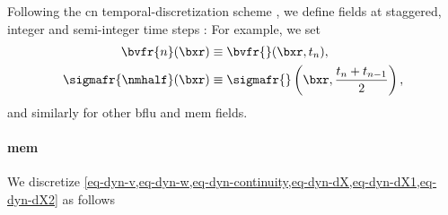 Following the \ac{cn} temporal-discretization scheme \cite{crankPracticalMethodNumerical1947}, we define fields at staggered,  integer and semi-integer time steps  \cite{loggAutomatedSolutionDifferential2012}: For example, we set
\begin{align}
        \label{eq_time_step_1}
        \bvfr{n}(\bxr)          & \equiv \bvfr{}(\bxr, t_n)  ,                               \\
        \label{eq_time_step_2}
        \sigmafr{\nmhalf}(\bxr) & \equiv \sigmafr{}\left(\bxr, \frac{t_n+t_{n-1}}{2}\right),
\end{align}
and similarly for other \ac{bflu} and \ac{mem} fields.

\paragraph{\Acl{mem}}\label{sec_temp_discretization_mem_mem}


We discretize \cref{eq-dyn-v,eq-dyn-w,eq-dyn-continuity,eq-dyn-dX,eq-dyn-dX1,eq-dyn-dX2} as follows


